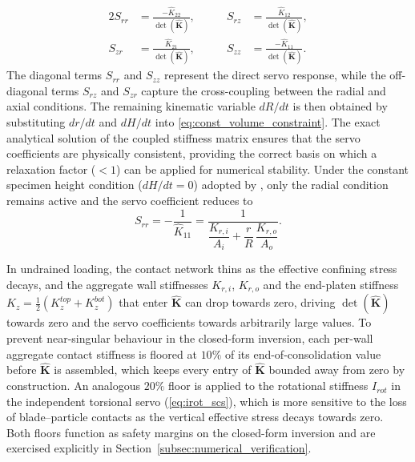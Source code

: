 \begin{alignat}{2}
S_{rr} &= \frac{-\hat{K}_{22}}{\det(\hat{\mathbf{K}})}, &\qquad
S_{rz} &= \frac{\hat{K}_{12}}{\det(\hat{\mathbf{K}})}, \label{eq:servo_coeff_r}\\[4pt]
S_{zr} &= \frac{\hat{K}_{21}}{\det(\hat{\mathbf{K}})}, &\qquad
S_{zz} &= \frac{-\hat{K}_{11}}{\det(\hat{\mathbf{K}})}. \label{eq:servo_coeff_z}
\end{alignat}
The diagonal terms $S_{rr}$ and $S_{zz}$ represent the direct servo response, while the off-diagonal terms $S_{rz}$ and $S_{zr}$ capture the cross-coupling between the radial and axial conditions. The remaining kinematic variable $dR/dt$ is then obtained by substituting $dr/dt$ and $dH/dt$ into \cref{eq:const_volume_constraint}. The exact analytical solution of the coupled stiffness matrix ensures that the servo coefficients are physically consistent, providing the correct basis on which a relaxation factor ($<1$) can be applied for numerical stability. Under the constant specimen height condition ($dH/dt=0$) adopted by \citet{Han2024jgs}, only the radial condition remains active and the servo coefficient reduces to
\begin{equation}
S_{rr} = -\frac{1}{\hat{K}_{11}} = \frac{1}{\dfrac{K_{r,i}}{A_i}+\dfrac{r}{R}\,\dfrac{K_{r,o}}{A_o}}.
\label{eq:Srr_constantH_main}
\end{equation}

In undrained loading, the contact network thins as the effective confining stress decays, and the aggregate wall stiffnesses $K_{r,i}$, $K_{r,o}$ and the end-platen stiffness $K_z=\tfrac{1}{2}(K_z^{top}+K_z^{bot})$ that enter $\hat{\mathbf{K}}$ can drop towards zero, driving $\det(\hat{\mathbf{K}})$ towards zero and the servo coefficients towards arbitrarily large values. To prevent near-singular behaviour in the closed-form inversion, each per-wall aggregate contact stiffness is floored at $10\%$ of its end-of-consolidation value before $\hat{\mathbf{K}}$ is assembled, which keeps every entry of $\hat{\mathbf{K}}$ bounded away from zero by construction. An analogous $20\%$ floor is applied to the rotational stiffness $I_{rot}$ in the independent torsional servo (\cref{eq:irot_scs}), which is more sensitive to the loss of blade--particle contacts as the vertical effective stress decays towards zero. Both floors function as safety margins on the closed-form inversion and are exercised explicitly in Section~\ref{subsec:numerical_verification}.

